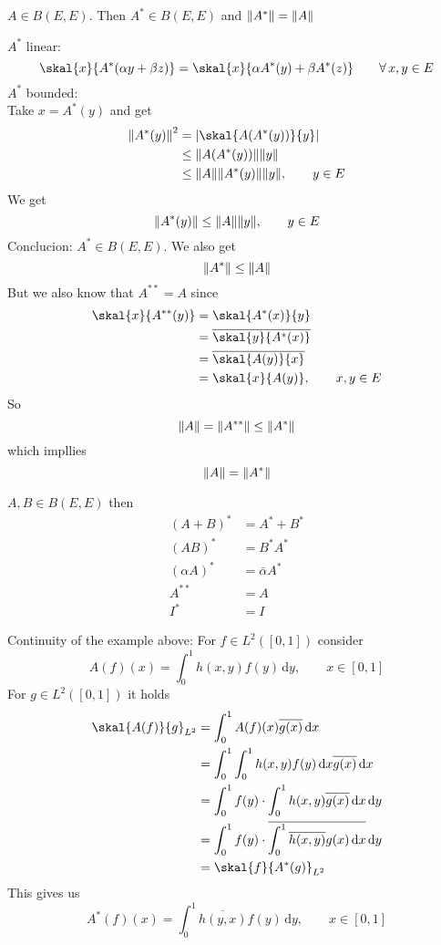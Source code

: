 \begin{proposition}
	$A \in B(E,E)$. Then $A^* \in B(E,E) $ and $\norm{A^*} = \norm{A}$
\end{proposition}
\begin{beweis}
	$A^*$ linear:
	\[
		\skal{x}{A^* ( \alpha y + \beta z)} = \skal{x}{\alpha A^*(y) + \beta A^*(z)} \qquad \forall\, x,y \in E
	\]
	$A^*$ bounded: \\ Take $x= A^*(y)$ and get
	\begin{align*}
		\norm{A^*(y)}^2 &= \abs{\skal{A(A^*(y))}{y}} \\
		&\leq \norm{A(A^*(y))} \norm{y} \\
		&\leq \norm{A} \norm{A^*(y)} \norm{y}, \qquad y \in E
	\end{align*}
	We get
	\[
		\norm{A^*(y)} \leq \norm{A} \norm{y}, \qquad y \in E
	\]
	Conclucion: $A^* \in B(E,E)$. We also get 
	\[
		\norm{A^*} \leq \norm{A}
	\]
	But we also know that $A^{**} = A$ since
	\begin{align*}
		\skal{x}{A^{**}(y)} &= \skal{A^*(x)}{y} \\
		&= \overline{\skal{y}{A^*(x)}} \\
		&= \overline{\skal{A(y)}{x}} \\
		&= \skal{x}{A(y)}, \qquad x,y \in E
	\end{align*}
	So \[
		\norm{A} = \norm{A^{**}} \leq \norm{A^*}
	\]
	which impllies
	\[
		\norm{A} = \norm{A^*}
	\]
\end{beweis}
\begin{bemerkung}
	$A,B \in B(E,E)$ then
	\begin{align*}
		(A+B)^* &= A^* + B^* \\
		(AB)^* &= B^* A^* \\
		(\alpha A)^* &= \bar{\alpha}A^* \\
		A^{**} &= A \\
		I^* &= I
	\end{align*}
\end{bemerkung}
\begin{beispiel}
	Continuity of the example above: For $f \in L^2([0,1])$ consider
	\[
		A(f)(x) = \int_{0}^{1}h(x,y)f(y) \,\mathrm{d}y, \qquad x \in [0,1]
	\]
	For $g \in L^2([0,1])$ it holds
	\begin{align*}
		\skal{A(f)}{g}_{L^2} &= \int_{0}^{1} A(f)(x)\overline{g(x)} \,\mathrm{d}x \\
		&= \int_{0}^{1}\int_{0}^{1} h(x,y)f(y) \,\mathrm{d}x \overline{g(x)} \,\mathrm{d}x \\
		&= \int_{0}^{1}f(y) \cdot \int_{0}^{1}h(x,y) \overline{g(x)} \,\mathrm{d}x \,\mathrm{d}y \\
		&= \int_{0}^{1} f(y) \cdot \overline{\int_{0}^{1} \overline{h(x,y)} g(x) \,\mathrm{d}x} \,\mathrm{d}y \\
		&= \skal{f}{A^*(g)}_{L^2}
	\end{align*}
	This gives us 
	\[
		A^*(f)(x) = \int_{0}^{1} \overline{h(y,x)}f(y) \,\mathrm{d}y, \qquad x \in [0,1]
	\]
\end{beispiel}

